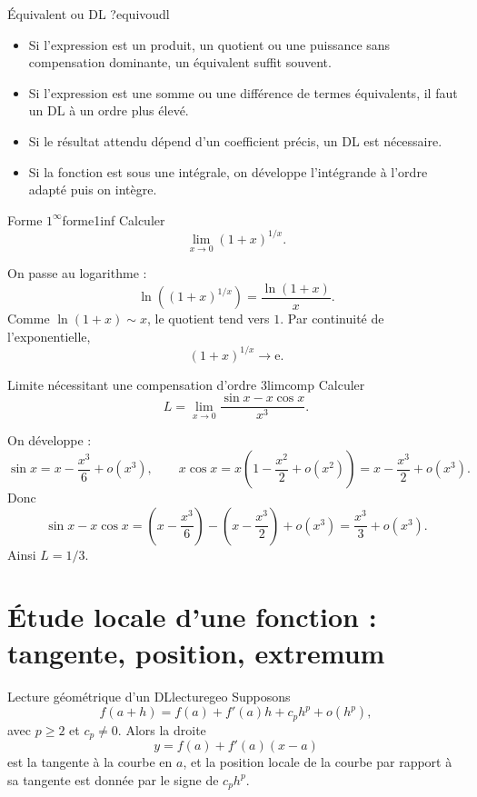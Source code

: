 \documentclass[11pt,a4paper]{article}
\newcommand{\e}{\mathrm{e}}
\begin{document}
\begin{methodbox}{Équivalent ou DL ?}{equivoudl}
\begin{itemize}[label=$\triangleright$]
\item Si l'expression est un produit, un quotient ou une puissance sans compensation dominante, un équivalent suffit souvent.
\item Si l'expression est une somme ou une différence de termes équivalents, il faut un DL à un ordre plus élevé.
\item Si le résultat attendu dépend d'un coefficient précis, un DL est nécessaire.
\item Si la fonction est sous une intégrale, on développe l'intégrande à l'ordre adapté puis on intègre.
\end{itemize}
\end{methodbox}

\begin{examplebox}{Forme $1^\infty$}{forme1inf}
Calculer
\[
  \lim_{x\to0}(1+x)^{1/x}.
\]
\end{examplebox}

On passe au logarithme :
\[
  \ln\left((1+x)^{1/x}\right)=\frac{\ln(1+x)}{x}.
\]
Comme $\ln(1+x)\sim x$, le quotient tend vers $1$. Par continuité de l'exponentielle,
\[
  (1+x)^{1/x}\to \e.
\]

\begin{examplebox}{Limite nécessitant une compensation d'ordre 3}{limcomp}
Calculer
\[
  L=\lim_{x\to0}\frac{\sin x-x\cos x}{x^3}.
\]
\end{examplebox}

On développe :
\[
  \sin x=x-\frac{x^3}{6}+o(x^3),
  \qquad
  x\cos x=x\left(1-\frac{x^2}{2}+o(x^2)\right)=x-\frac{x^3}{2}+o(x^3).
\]
Donc
\[
  \sin x-x\cos x=\left(x-\frac{x^3}{6}\right)-\left(x-\frac{x^3}{2}\right)+o(x^3)=\frac{x^3}{3}+o(x^3).
\]
Ainsi $L=1/3$.

\section{Étude locale d'une fonction : tangente, position, extremum}

\begin{propositionbox}{Lecture géométrique d'un DL}{lecturegeo}
Supposons
\[
  f(a+h)=f(a)+f'(a)h+c_p h^p+o(h^p),
\]
avec $p\ge2$ et $c_p\ne0$. Alors la droite
\[
  y=f(a)+f'(a)(x-a)
\]
est la tangente à la courbe en $a$, et la position locale de la courbe par rapport à sa tangente est donnée par le signe de $c_p h^p$.
\end{propositionbox}
\end{document}
